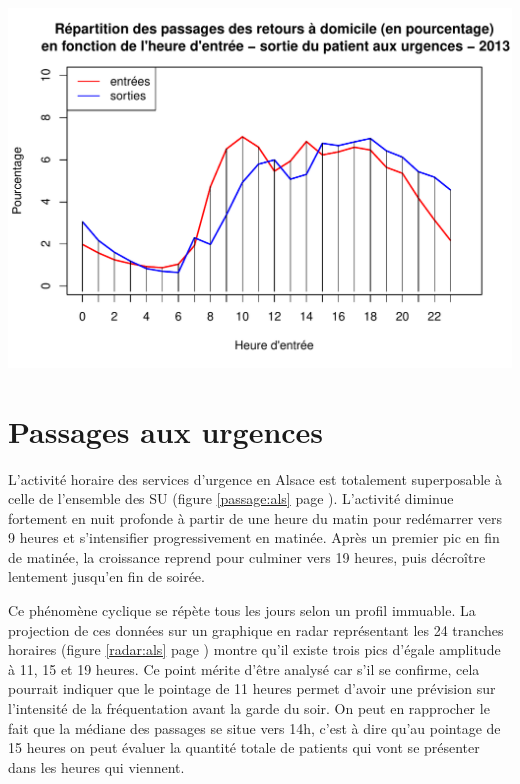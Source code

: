 \documentclass[12pt,english,french,twoside]{book}\usepackage[]{graphicx}\usepackage[]{color}
\makeatletter
\def\maxwidth{ %
  \ifdim\Gin@nat@width>\linewidth
    \linewidth
  \else
    \Gin@nat@width
  \fi
}
\newenvironment{knitrout}{}{} %
\makeatother
\begin{document}
\begin{center}

\begin{knitrout}
\color{fgcolor}
\includegraphics[width=\maxwidth]{figure/es_dom-1} 

\end{knitrout}
\label{fig:es_dom}%
\end{center}

\section{Passages aux urgences}


L'activité horaire des services d'urgence en Alsace est totalement superposable à celle de l'ensemble des SU (figure \ref{passage:als} page \pageref{passage:als}). L'activité diminue fortement en nuit profonde à partir de une heure du matin pour redémarrer vers 9 heures et s'intensifier progressivement en matinée. Après un premier pic en fin de matinée, la croissance reprend pour culminer vers 19 heures, puis décroître lentement jusqu'en fin de soirée.

Ce phénomène cyclique se répète tous les jours selon un profil immuable. La projection de ces données sur un graphique en radar représentant les 24 tranches horaires (figure \ref{radar:als} page \pageref{radar:als}) montre qu'il existe trois pics d'égale amplitude à 11, 15 et 19 heures. Ce point mérite d'être analysé car s'il se confirme, cela pourrait indiquer que le pointage de 11 heures permet d'avoir une prévision sur l'intensité de la fréquentation avant la garde du soir. On peut en rapprocher le fait que la médiane des passages se situe vers 14h, c'est à dire qu'au pointage de 15 heures on peut évaluer la quantité totale de patients qui vont se présenter dans les heures qui viennent.
\end{document}
